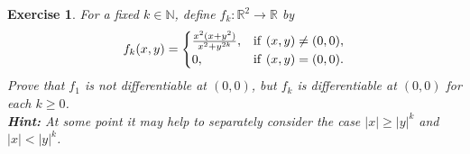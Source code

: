 \documentclass[11pt]{article}
\newtheorem{exercise}{Exercise}[section]
\theoremstyle{definition}
\numberwithin{equation}{subsection}
\begin{document}
\medskip

\begin{exercise}
For a fixed $k \in \mathbb{N}$, define $f_k: \mathbb{R}^2 \to \mathbb{R}$ by
\begin{align*}
    f_k(x,y) = \begin{cases}
          \frac{x^2(x + y^2)}{x^2 + y^{2k}}, & {\rm if}\,\, (x,y) \neq (0,0), \\
        0, & {\rm if}\,\, (x,y) = (0,0).
    \end{cases}
\end{align*}
Prove that $f_1$ is not differentiable at $(0,0)$, but $f_k$ is differentiable at $(0,0)$ for each $k \geq 0$.\\
{\bf Hint:} At some point it may help to separately consider the case $|x| \geq |y|^k$ and $|x| < |y|^k$.
\end{exercise}
\end{document}
